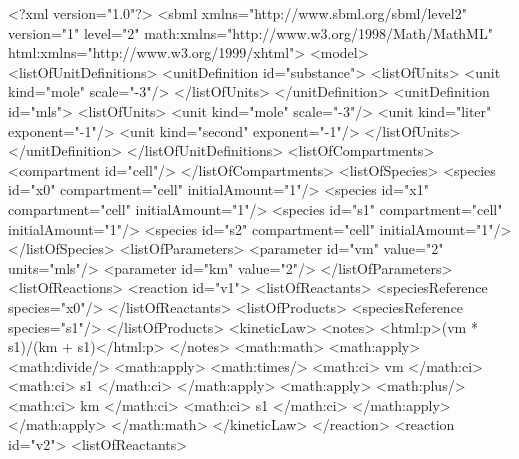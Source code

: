 \documentclass[10pt]{cekarticle}
\begin{document}
\begin{example}
<?xml version="1.0"?>
<sbml xmlns="http://www.sbml.org/sbml/level2" version="1" level="2"
      math:xmlns="http://www.w3.org/1998/Math/MathML"
      html:xmlns="http://www.w3.org/1999/xhtml">
    <model>
        <listOfUnitDefinitions>
            <unitDefinition id="substance">
                <listOfUnits>
                    <unit kind="mole" scale="-3"/>
                </listOfUnits>
            </unitDefinition>
            <unitDefinition id="mls">
                <listOfUnits>
                    <unit kind="mole"   scale="-3"/>
                    <unit kind="liter"  exponent="-1"/>
                    <unit kind="second" exponent="-1"/>
                </listOfUnits>
            </unitDefinition>
        </listOfUnitDefinitions>
        <listOfCompartments>
            <compartment id="cell"/>
        </listOfCompartments>
        <listOfSpecies>
            <species id="x0" compartment="cell" initialAmount="1"/>
            <species id="x1" compartment="cell" initialAmount="1"/>
            <species id="s1" compartment="cell" initialAmount="1"/>
            <species id="s2" compartment="cell" initialAmount="1"/>
        </listOfSpecies>
        <listOfParameters>
            <parameter id="vm" value="2" units="mls"/>
            <parameter id="km" value="2"/>
        </listOfParameters>
        <listOfReactions>
            <reaction id="v1">
                <listOfReactants>
                    <speciesReference species="x0"/>
                </listOfReactants>
                <listOfProducts>
                    <speciesReference species="s1"/>
                </listOfProducts>
                <kineticLaw>
                    <notes>
                        <html:p>(vm * s1)/(km + s1)</html:p>
                    </notes>
                    <math:math>
                        <math:apply>
                            <math:divide/>
                            <math:apply>
                                <math:times/>
                                <math:ci> vm </math:ci>
                                <math:ci> s1 </math:ci>
                            </math:apply>
                            <math:apply>
                                <math:plus/>
                                <math:ci> km </math:ci>
                                <math:ci> s1 </math:ci>
                            </math:apply>
                        </math:apply>
                    </math:math>
                </kineticLaw>
            </reaction>
            <reaction id="v2">
                <listOfReactants>

\end{example}
\end{document}
